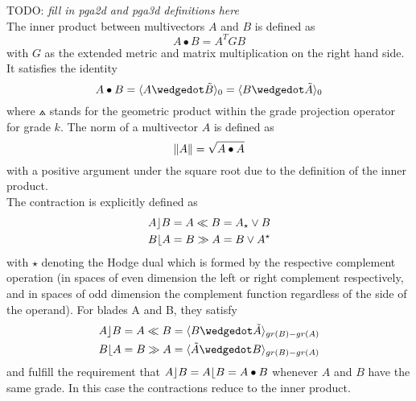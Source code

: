 TODO: \emph{fill in pga2d and pga3d definitions here} \\


The inner product between multivectors $A$ and $B$ is defined as
\begin{equation}
    A \bullet B = A^{T} G B
    \label{eg:inner_product_metric}
\end{equation}
with $G$ as the extended metric and matrix multiplication on the right hand side. It
satisfies the identity
\begin{equation}
    A \bullet B  = \grprj{A \wedgedot \tilde{B}}{0} = \grprj{ B \wedgedot \tilde{A} }{0}
    \label{eq:inner_product_link_to_gpr}
\end{equation}
where $\wedgedot$ stands for the geometric product within the grade projection operator
 for grade $k$. The norm of a multivector $A$ is defined as
\begin{equation}
    \left \lVert {A} \right \rVert = \sqrt{A \bullet A}
    \label{eq:norm_mv}
\end{equation}
with a positive argument under the square root due to the definition of the inner product.
\\

The contraction is explicitly defined as
\begin{subequations}
    \begin{align}
    A \rfloor B & = A \ll B = A_{\star} \vee B
    \label{eq:lcontr} \\
    B \lfloor A & = B \gg A = B \vee A^{\star}
    \label{eq:rcontr}
    \end{align}
\end{subequations}
with $\star$ denoting the Hodge dual which is formed by the respective complement
operation (in spaces of even dimension the left or right complement respectively, and in
spaces of odd dimension the complement function regardless of the side of the operand).
For blades A and B, they satisfy
\begin{subequations}
    \begin{align}
    A \lcontr B &  = A \ll B = \grprj{B \wedgedot \tilde{A}}{gr(B)-gr(A)}
    \label{eq:lcontr_gpr} \\
    B \rcontr A & = B \gg A = \grprj{\tilde{A} \wedgedot B}{gr(B)-gr(A)}
    \label{eq:rcontr_gpr}
    \end{align}
\end{subequations}
and fulfill the requirement that $A \rfloor B = A \lfloor B = A \bullet B$ whenever $A$
and $B$ have the same grade. In this case the contractions reduce to the inner product. \\



